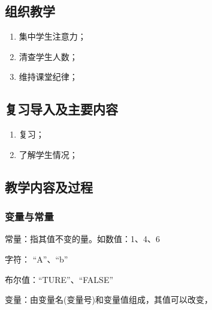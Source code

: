 \jxhj{%
	}

\makeshouye %

\subsection{组织教学}
\begin{enumerate}[\hspace{2em}1、]
	\item 集中学生注意力；
	\item 清查学生人数；
	\item 维持课堂纪律；
\end{enumerate}
\subsection{复习导入及主要内容}
\begin{enumerate}[\hspace{2em}1、]
\item 复习；
\item 了解学生情况；
\end{enumerate}
\subsection{教学内容及过程}
\subsubsection{变量与常量} 
常量：指其值不变的量。如数值：1、4、6
\par
字符： “A”、“b”
\par
布尔值：“TURE”、“FALSE”
\par
变量：由变量名(变量号)和变量值组成，其值可以改变，

